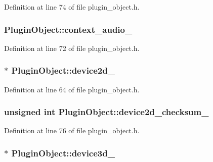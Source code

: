 Definition at line 74 of file plugin\_\-object.h.

\hypertarget{class_plugin_object_a29a7c72b105825ff135a29c9af9206f2}{
\subsubsection[{context\_\-audio\_\-}]{ {\bf PluginObject::context\_\-audio\_\-}}}
\label{class_plugin_object_a29a7c72b105825ff135a29c9af9206f2}


Definition at line 72 of file plugin\_\-object.h.

\hypertarget{class_plugin_object_a32c9649b557037cc8fbbf95f8c126c15}{
\subsubsection[{device2d\_\-}]{$\ast$ {\bf PluginObject::device2d\_\-}}}
\label{class_plugin_object_a32c9649b557037cc8fbbf95f8c126c15}


Definition at line 64 of file plugin\_\-object.h.

\hypertarget{class_plugin_object_ac792c1966624836cbbadf26eaeae4e52}{
\subsubsection[{device2d\_\-checksum\_\-}]{\setlength{\rightskip}{0pt plus 5cm}unsigned int {\bf PluginObject::device2d\_\-checksum\_\-}}}
\label{class_plugin_object_ac792c1966624836cbbadf26eaeae4e52}


Definition at line 76 of file plugin\_\-object.h.

\hypertarget{class_plugin_object_af2fd117655e58027408e3cde1f7283fb}{
\subsubsection[{device3d\_\-}]{$\ast$ {\bf PluginObject::device3d\_\-}}}
\label{class_plugin_object_af2fd117655e58027408e3cde1f7283fb}


